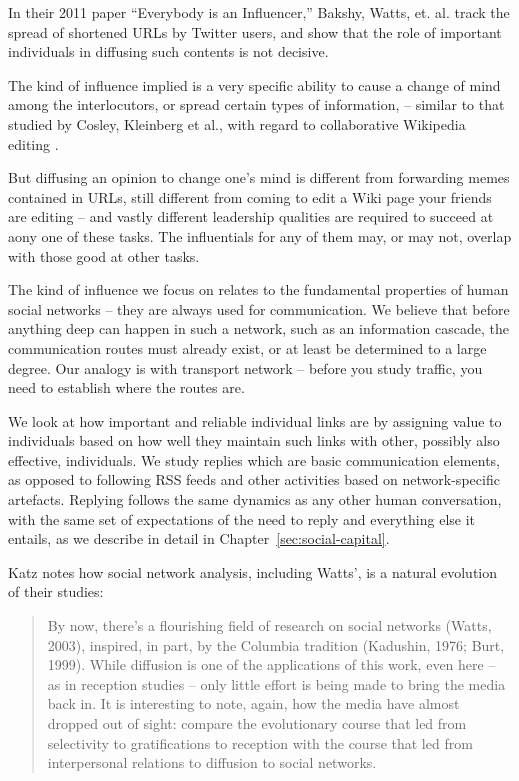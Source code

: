 \documentclass[10pt,oneside]{memoir}
\begin{document}
In their 2011 paper ``Everybody is an Influencer,'' Bakshy, Watts, et. al. \cite{bakshy2011everyone} track the spread of shortened URLs by Twitter users, and show that the role of important individuals in diffusing such contents is not decisive.


The kind of influence implied is a very specific ability to cause a change of mind among the interlocutors, or spread certain types of information, -- similar to that studied by Cosley, Kleinberg et al., with regard to collaborative Wikipedia editing \cite{cosley2010sequential}.


But diffusing an opinion to change one's mind is different from forwarding memes contained in URLs, still different from coming to edit a Wiki page your friends are editing -- and vastly different leadership qualities are required to succeed at aony one of these tasks.  The influentials for any of them may, or may not, overlap with those good at other tasks.


The kind of influence we focus on relates to the fundamental properties of human social networks -- they are always used for communication.   We believe that before anything deep can happen in such a network, such as an information cascade, the communication routes must already exist, or at least be determined to a large degree.  Our analogy is with transport network -- before you study traffic, you need to establish where the routes are.


We look at how important and reliable individual links are by assigning value to individuals based on how well they maintain such links with other, possibly also effective, individuals.  We study replies which are basic communication elements, as opposed to following RSS feeds and other activities based on network-specific artefacts.  Replying follows the same dynamics as any other human conversation, with the same set of expectations of the need to reply and everything else it entails, as we describe in detail in Chapter~\ref{sec:social-capital}. 


Katz notes how social network analysis, including Watts', is a natural evolution of their studies:


\begin{quote}
By now, there's a flourishing field of research on social networks (Watts, 2003), inspired, in part, by the Columbia tradition (Kadushin, 1976; Burt, 1999).  While diffusion is one of the applications of this work, even here -- as in reception studies -- only little effort is being made to bring the media back in.  It is interesting to note, again, how the media have almost dropped out of sight: compare the evolutionary  course that led from selectivity to gratifications to reception with the course that led from interpersonal relations to diffusion to social networks.
\end{quote}
\end{document}
